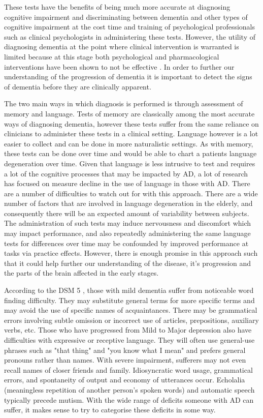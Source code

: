 \documentclass[10pt, letterpaper, twoside, openany]{book}
\begin{document}
These tests have the benefits of being much more accurate at diagnosing cognitive impairment and discriminating between dementia and other types of cognitive impairment at the cost time and training of psychological professionals such as clinical psychologists in administering these tests. However, the utility of diagnosing dementia at the point where clinical intervention is warranted is limited because at this stage both psychological and pharmacological interventions have been shown to not be effective \cite{Prince2015}. In order to further our understanding of the progression of dementia it is important to detect the signs of dementia before they are clinically apparent. 
\par
The two main ways in which diagnosis is performed is through assessment of memory and language. Tests of memory are classically among the most accurate ways of diagnosing dementia, however these tests suffer from the same reliance on clinicians to administer these tests in a clinical setting. Language however is a lot easier to collect and can be done in more naturalistic settings. As with memory, these tests can be done over time and would be able to chart a patients language degeneration over time. Given that language is less intrusive to test and requires a lot of the cognitive processes that may be impacted by AD, a lot of research has focused on measure decline in the use of language in those with AD. There are a number of difficulties to watch out for with this approach. There are a wide number of factors that are involved in language degeneration in the elderly, and consequently there will be an expected amount of variability between subjects. The administration of such tests may induce nervousness and discomfort which may impact performance, and also repeatedly administering the same language tests for differences over time may be confounded by improved performance at tasks via practice effects. However, there is enough promise in this approach such that it could help further our understanding of the disease, it's progression and the parts of the brain affected in the early stages.
\par
According to the DSM 5 \cite{AmericanPsychiatricAssociation2013}, those with mild dementia suffer from noticeable word finding difficulty. They may substitute general terms for more specific terms and may avoid the use of specific names of acquaintances. There may be grammatical errors involving subtle omission or incorrect use of articles, prepositions, auxiliary verbs, etc. Those who have progressed from Mild to Major depression also have difficulties with expressive or receptive language. They will often use general-use phrases such as "that thing" and "you know what I mean" and prefers general pronouns rather than names. With severe impairment, sufferers may not even recall names of closer friends and family. Idiosyncratic word usage, grammatical errors, and spontaneity of output and economy of utterances occur. Echolalia (meaningless repetition of another person's spoken words) and automatic speech typically precede mutism. With the wide range of deficits someone with AD can suffer, it makes sense to try to categorise these deficits in some way.
\end{document}
